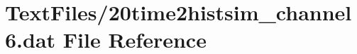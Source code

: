 \hypertarget{20time2histsim__channel6_8dat}{}\section{Text\+Files/20time2histsim\+\_\+channel6.dat File Reference}
\label{20time2histsim__channel6_8dat}
